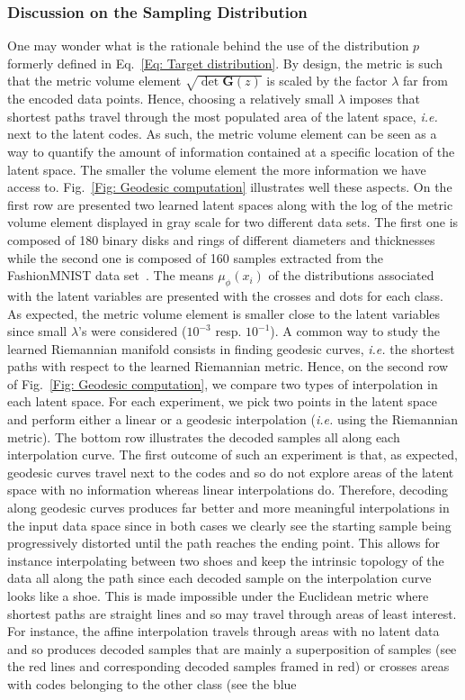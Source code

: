 \documentclass[10pt,journal,compsoc]{IEEEtran}
\begin{document}
    \subsubsection{Discussion on the Sampling Distribution}\label{Sec: Sampling discussion}
    One may wonder what is the rationale behind the use of the distribution $p$ formerly defined in Eq.~\eqref{Eq: Target distribution}. By design, the metric is such that the metric volume element $\sqrt{\det \mathbf{G}(z)}$ is scaled by the factor $\lambda$ far from the encoded data points. Hence, choosing a relatively small $\lambda$ imposes that shortest paths travel through the most populated area of the latent space, \emph{i.e.} next to the latent codes. As such, the metric volume element can be seen as a way to quantify the amount of information contained at a specific location of the latent space. The smaller the volume element the more information we have access to. Fig.~\ref{Fig: Geodesic computation} illustrates well these aspects. On the first row are presented two learned latent spaces along with the log of the metric volume element displayed in gray scale for two different data sets. The first one is composed of 180 binary disks and rings of different diameters and thicknesses while the second one is composed of 160 samples extracted from the FashionMNIST data set~\cite{xiao_fashion-mnist_2017}. The means $\mu_{\phi}(x_i)$ of the distributions associated with the latent variables are presented with the crosses and dots for each class. As expected, the metric volume element is smaller close to the latent variables since small $\lambda$'s were considered ($10^{-3}$ resp. $10^{-1}$). A common way to study the learned Riemannian manifold consists in finding geodesic curves, \emph{i.e.} the shortest paths with respect to the learned Riemannian metric. Hence, on the second row of Fig.~\ref{Fig: Geodesic computation}, we compare two types of interpolation in each latent space. For each experiment, we pick two points in the latent space and perform either a linear or a geodesic interpolation (\emph{i.e.} using the Riemannian metric). The bottom row illustrates the decoded samples all along each interpolation curve. The first outcome of such an experiment is that, as expected, geodesic curves travel next to the codes and so do not explore areas of the latent space with no information whereas linear interpolations do. Therefore, decoding along geodesic curves produces far better and more meaningful interpolations in the input data space since in both cases we clearly see the starting sample being progressively distorted until the path reaches the ending point. This allows for instance interpolating between two shoes and keep the intrinsic topology of the data all along the path since each decoded sample on the interpolation curve looks like a shoe. This is made impossible under the Euclidean metric where shortest paths are straight lines and so may travel through areas of least interest. For instance, the affine interpolation travels through areas with no latent data and so produces decoded samples that are mainly a superposition of samples (see the red lines and corresponding decoded samples framed in red) or crosses areas with codes belonging to the other class (see the blue 
\end{document}
